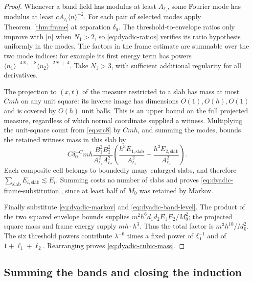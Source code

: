 \begin{proof}
Whenever a band field has modulus at least $A_{\ell_i}$, some Fourier
mode has modulus at least $cA_{\ell_i}\langle n\rangle^{-2}$.
For each pair of selected modes apply Theorem~\ref{thm:frame} at
separation $\delta_0$.  The threshold-to-envelope ratios only improve
with $|n|$ when $N_1>2$, so \eqref{eq:dyadic-ratios} verifies its ratio
hypothesis uniformly in the modes.  The factors in the frame estimate
are summable over the two mode indices: for example its first energy
term has powers
$\langle n_1\rangle^{-4N_1+8}
 \langle n_2\rangle^{-2N_1+4}$.
Take $N_1>3$, with sufficient additional regularity for all derivatives.

The projection to $(x,t)$ of the measure restricted to a slab has mass
at most $Cmh$ on any unit square: its inverse image has dimensions
$O(1),O(h),O(1)$ and is covered by $O(h)$ unit balls.  This is an upper
bound on the full projected measure, regardless of which normal
coordinate supplied a witness.  Multiplying the unit-square count from
\eqref{eq:src8} by $Cmh$, and summing the modes, bounds the retained
witness mass in this slab by
\[
 C\delta_0^{-C}mh
 \frac{B_1^2B_2^2}{A_{\ell_1}^2A_{\ell_2}^2}
 \left(\frac{h^3E_{1,\mathrm{slab}}}{A_{\ell_1}^2}
       +\frac{h^3E_{2,\mathrm{slab}}}{A_{\ell_2}^2}\right).
\]
Each composite cell belongs to boundedly many enlarged slabs, and
therefore $\sum_{\mathrm{slab}}E_{i,\mathrm{slab}}\lesssim E_i$.
Summing costs no number of slabs and proves
\eqref{eq:dyadic-frame-substitution}, since at least half of $M_0$
was retained by Markov.

Finally substitute \eqref{eq:dyadic-markov} and
\eqref{eq:dyadic-band-level}.  The product of the two squared envelope
bounds supplies $m^2h^6d_1d_2E_1E_2/M_0^2$; the projected square mass
and frame energy supply $mh\cdot h^3$.  Thus the total factor is
$m^3h^{10}/M_0^2$.  The six threshold powers contribute
$\lambda^{-6}$ times a fixed power of $\delta_0^{-1}$ and of
$1+\ell_1+\ell_2$.  Rearranging proves
\eqref{eq:dyadic-cubic-mass}.
\end{proof}

\subsection{Summing the bands and closing the induction}

